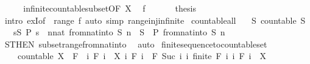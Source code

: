 \begin{isabellebody}
%
\isadelimproof
%
\endisadelimproof
%
\isatagproof
{}\isamarkupfalse%
\ {\isacharminus}\isanewline
\ \ \isamarkupfalse%
\ infinite{\isacharunderscore}countable{\isacharunderscore}subset{\isacharbrackleft}OF\ X{\isacharbrackright}\ \isamarkupfalse%
\ f\ \isacommand{{\isachardot}{\isachardot}}\isamarkupfalse%
\isanewline
\ \ \isamarkupfalse%
\ \isamarkupfalse%
\ {\isacharquery}thesis\isanewline
\ \ \ \ \isamarkupfalse%
\ {\isacharparenleft}intro\ exI{\isacharbrackleft}of\ {\isacharunderscore}\ {\isachardoublequoteopen}range\ f{\isachardoublequoteclose}{\isacharbrackright}{\isacharparenright}\ {\isacharparenleft}auto\ simp{\isacharcolon}\ range{\isacharunderscore}inj{\isacharunderscore}infinite{\isacharparenright}\isanewline
{}\isamarkupfalse%
%
\endisatagproof
{\isafoldproof}%
%
\isadelimproof
\isanewline
%
\endisadelimproof
\isanewline
{}\isamarkupfalse%
\ countable{\isacharunderscore}all{\isacharcolon}\isanewline
\ \ \ S{\isacharcolon}\ {\isachardoublequoteopen}countable\ S{\isachardoublequoteclose}\isanewline
\ \ \ {\isachardoublequoteopen}{\isacharparenleft}{\isasymforall}s{\isasymin}S{\isachardot}\ P\ s{\isacharparenright}\ {\isasymlongleftrightarrow}\ {\isacharparenleft}{\isasymforall}n{\isacharcolon}{\isacharcolon}nat{\isachardot}\ from{\isacharunderscore}nat{\isacharunderscore}into\ S\ n\ {\isasymin}\ S\ {\isasymlongrightarrow}\ P\ {\isacharparenleft}from{\isacharunderscore}nat{\isacharunderscore}into\ S\ n{\isacharparenright}{\isacharparenright}{\isachardoublequoteclose}\isanewline
%
\isadelimproof
\ \ %
\endisadelimproof
%
\isatagproof
{}\isamarkupfalse%
\ S{\isacharbrackleft}THEN\ subset{\isacharunderscore}range{\isacharunderscore}from{\isacharunderscore}nat{\isacharunderscore}into{\isacharbrackright}\ \isamarkupfalse%
\ auto%
\endisatagproof
{\isafoldproof}%
%
\isadelimproof
\isanewline
%
\endisadelimproof
\isanewline
{}\isamarkupfalse%
\ finite{\isacharunderscore}sequence{\isacharunderscore}to{\isacharunderscore}countable{\isacharunderscore}set{\isacharcolon}\isanewline
\ \ \ \ {\isachardoublequoteopen}countable\ X{\isachardoublequoteclose}\ \ F\ \ {\isachardoublequoteopen}{\isasymAnd}i{\isachardot}\ F\ i\ {\isasymsubseteq}\ X{\isachardoublequoteclose}\ {\isachardoublequoteopen}{\isasymAnd}i{\isachardot}\ F\ i\ {\isasymsubseteq}\ F\ {\isacharparenleft}Suc\ i{\isacharparenright}{\isachardoublequoteclose}\ {\isachardoublequoteopen}{\isasymAnd}i{\isachardot}\ finite\ {\isacharparenleft}F\ i{\isacharparenright}{\isachardoublequoteclose}\ {\isachardoublequoteopen}{\isacharparenleft}{\isasymUnion}i{\isachardot}\ F\ i{\isacharparenright}\ {\isacharequal}\ X{\isachardoublequoteclose}\isanewline

\end{isabellebody}
